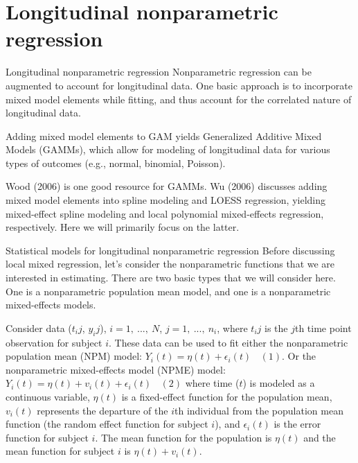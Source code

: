 \documentclass[
  9pt,
  ignorenonframetext,
]{beamer}
\begin{document}
\hypertarget{longitudinal-nonparametric-regression-1}{%
\section{Longitudinal nonparametric
regression}\label{longitudinal-nonparametric-regression-1}}

\begin{frame}{Longitudinal nonparametric regression}
\protect\hypertarget{longitudinal-nonparametric-regression-2}{}
Nonparametric regression can be augmented to account for longitudinal
data. One basic approach is to incorporate mixed model elements while
fitting, and thus account for the correlated nature of longitudinal
data.

Adding mixed model elements to GAM yields Generalized Additive Mixed
Models (GAMMs), which allow for modeling of longitudinal data for
various types of outcomes (e.g., normal, binomial, Poisson).

Wood (2006) is one good resource for GAMMs. Wu (2006) discusses adding
mixed model elements into spline modeling and LOESS regression, yielding
mixed-effect spline modeling and local polynomial mixed-effects
regression, respectively. Here we will primarily focus on the latter.
\end{frame}

\begin{frame}{Statistical models for longitudinal nonparametric
regression}
\protect\hypertarget{statistical-models-for-longitudinal-nonparametric-regression}{}
Before discussing local mixed regression, let's consider the
nonparametric functions that we are interested in estimating. There are
two basic types that we will consider here. One is a nonparametric
population mean model, and one is a nonparametric mixed-effects models.

Consider data (\(t_ij\), \(y_ij\)), \(i=1,\ ...,\ N\),
\(j=1,\ ...,\ n_i\), where \(t_ij\) is the \(j\)th time point
observation for subject \(i\). These data can be used to fit either the
nonparametric population mean (NPM) model:
\(Y_i(t) = \eta (t)+\epsilon _i (t) \ \ \ \ (1)\). Or the nonparametric
mixed-effects model (NPME) model:
\(Y_i(t)= \eta(t)+ v_i(t)+\epsilon _i(t) \ \ \  \ (2)\) where time
(\(t\)) is modeled as a continuous variable, \(\eta (t)\) is a
fixed-effect function for the population mean, \(v_i(t)\) represents the
departure of the \(i\)th individual from the population mean function
(the random effect function for subject \(i\)), and \(\epsilon_i(t)\) is
the error function for subject \(i\). The mean function for the
population is \(\eta (t)\) and the mean function for subject \(i\) is
\(\eta (t) + v_i(t)\).
\end{frame}
\end{document}
